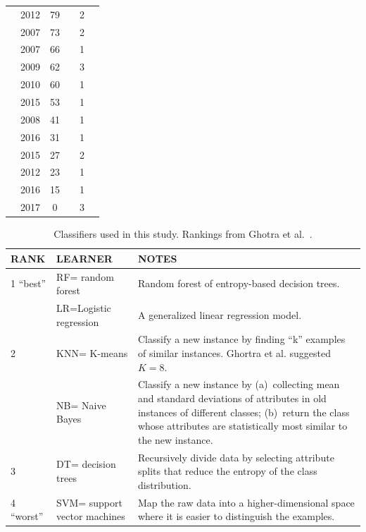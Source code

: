 \documentclass[sigconf]{acmart}
\newcommand{\cmark}{\ding{51}}%
\newcommand{\xmark}{\ding{55}}%
\theoremstyle{break}
\begin{document}
\begin{table}[!b]
\begin{tabular}{c|c|c|c|c|c}
        \cite{li2012sample} & 2012 & 79 & \cmark & 2 & \xmark  \\ 
        \cite{kamei2007effects} & 2007 & 73 & \xmark & 2 & \cmark\\  
        \cite{pelayo2007applying} & 2007 & 66 & \xmark & 1 & \cmark \\  
        \cite{jiang2009variance} & 2009 & 62 & \cmark & 3 & \xmark  \\ 
        \cite{khoshgoftaar2010attribute} & 2010 & 60 & \cmark & 1 & \cmark  \\  
        \cite{ghotra2015revisiting} & 2015 & 53 & \cmark & 1 & \xmark  \\  
        \cite{jiang2008can} & 2008 & 41 & \cmark & 1 & \xmark  \\  
         \cite{tantithamthavorn2016automated} & 2016 & 31 & \cmark & 1 & \xmark  \\ 
        \cite{tan2015online} & 2015 & 27 & \xmark & 2 & \cmark \\  
        \cite{pelayo2012evaluating} & 2012 & 23 & \xmark & 1 & \cmark \\  
        \cite{fu2016tuning} & 2016 & 15 & \cmark & 1 & \xmark  \\  
        \cite{bennin2017mahakil} & 2017 & 0 & \cmark & 3 & \cmark \\
\end{tabular}
\vspace{-0.3cm}
\end{table}

 \begin{table}[!t]
 \caption{Classifiers used in this study.
 Rankings
 from Ghotra et al.~\cite{ghotra2015revisiting}.}
 \vspace{-0.2cm}
 \label{tbl:learners}
 \footnotesize
 \begin{tabular}{l|l|p{4.5in}}
{\bf RANK} & {\bf LEARNER} & {\bf NOTES}\\\hline
 1 ``best'' & RF= random forest & 
 Random forest of entropy-based decision trees.\\\cline{2-3}
 &  LR=Logistic regression &
 A generalized linear regression
model.\\\hline
 2 & KNN= K-means &  Classify a new instance by finding ``k'' examples of similar instances.
 Ghortra et al. suggested
 $K=8$.\\\cline{2-3}
 & NB= Naive Bayes &  Classify a new instance by (a)~collecting mean and standard deviations of attributes in old instances of  different classes; (b)~return the class whose attributes are statistically most similar to the new instance.\\\hline
 3 & DT= decision trees & Recursively
 divide data by selecting attribute splits
 that reduce the entropy of the class distribution.\\\hline

 4 ``worst'' & SVM= support vector machines &
 Map the raw data into a higher-dimensional space where it is easier to distinguish the examples.
 \\\hline
 \end{tabular}
 \vspace{-0.2cm}
 \end{table}
 
\end{document}

